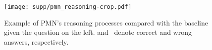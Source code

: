\documentclass{article}
\newcommand{\cmark}{{\color{ForestGreen}\ding{51}}}
\newcommand{\xmark}{{\color{BrickRed}\ding{55}}}
\begin{document}
\begin{figure}[!htb]
\vspace{-2mm}
\texttt{[image: supp/pmn\_reasoning-crop.pdf]}
\caption{\small Example of PMN's reasoning processes compared with the baseline given the question on the left. \cmark and \xmark~denote correct and wrong answers, respectively.}
\label{fig:appendixc}
\vspace{-2mm}
\end{figure}

{\small


}
\end{document}
